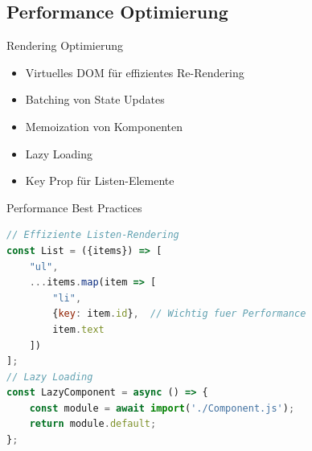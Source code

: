 \subsection{Performance Optimierung}

\begin{concept}{Rendering Optimierung}
    \begin{itemize}
        \item Virtuelles DOM für effizientes Re-Rendering
        \item Batching von State Updates
        \item Memoization von Komponenten
        \item Lazy Loading
        \item Key Prop für Listen-Elemente
    \end{itemize}
\end{concept}

\begin{KR}{Performance Best Practices}
\begin{lstlisting}[language=JavaScript, style=basesmol]
// Effiziente Listen-Rendering
const List = ({items}) => [
    "ul",
    ...items.map(item => [
        "li",
        {key: item.id},  // Wichtig fuer Performance
        item.text
    ])
];
// Lazy Loading
const LazyComponent = async () => {
    const module = await import('./Component.js');
    return module.default;
};
\end{lstlisting}
\end{KR}